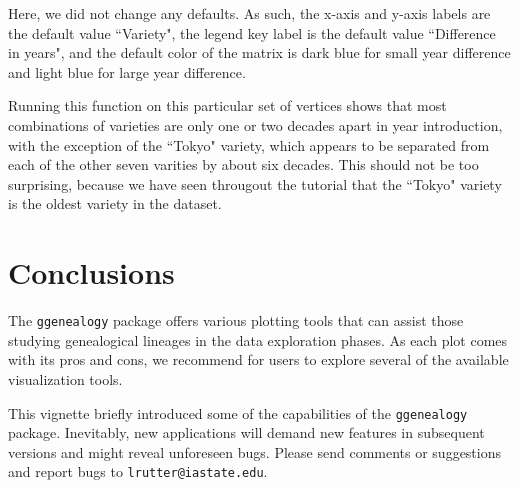 \documentclass{article}
\numberwithin{equation}{section} %
\newcommand{\pkg}[1]{{\texttt{#1}}}
\begin{document}
Here, we did not change any defaults. As such, the x-axis and y-axis labels are the default value ``Variety", the legend key label is the default value ``Difference in years", and the default color of the matrix is dark blue for small year difference and light blue for large year difference.

Running this function on this particular set of vertices shows that most combinations of varieties are only one or two decades apart in year introduction, with the exception of the ``Tokyo" variety, which appears to be separated from each of the other seven varities by about six decades. This should not be too surprising, because we have seen througout the tutorial that the ``Tokyo" variety is the oldest variety in the dataset.

\section{Conclusions}

The \pkg{ggenealogy} package offers various plotting tools that can assist those studying genealogical lineages in the data exploration phases. As each plot comes with its pros and cons, we recommend for users to explore several of the available visualization tools.

This vignette briefly introduced some of the capabilities of the \pkg{ggenealogy} package. Inevitably, new applications will demand new features in subsequent versions and might reveal unforeseen bugs. Please send comments or suggestions and report bugs to \texttt{lrutter@iastate.edu}.
\end{document}
